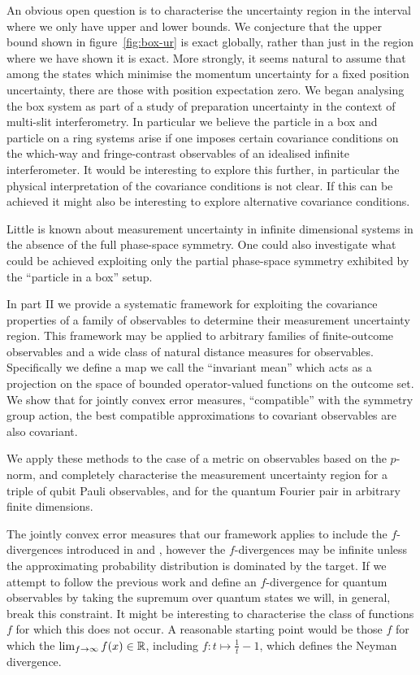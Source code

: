 An obvious open question is to characterise the uncertainty region in the interval where we only have upper and lower bounds. We conjecture that the upper bound shown in figure~\ref{fig:box-ur} is exact globally, rather than just in the region where we have shown it is exact. More strongly, it seems natural to assume that among the states which minimise the momentum uncertainty for a fixed position uncertainty, there are those with position expectation zero. We began analysing the box system as part of a study of preparation uncertainty in the context of multi-slit interferometry. In particular we believe the particle in a box and particle on a ring systems arise if one imposes certain covariance conditions on the which-way and fringe-contrast observables of an idealised infinite interferometer. It would be interesting to explore this further, in particular the physical interpretation of the covariance conditions is not clear. If this can be achieved it might also be interesting to explore alternative covariance conditions.

Little is known about measurement uncertainty in infinite dimensional systems in the absence of the full phase-space symmetry. One could also investigate what could be achieved exploiting only the partial phase-space symmetry exhibited by the ``particle in a box'' setup.


In part II we provide a systematic framework for exploiting the covariance properties of a family of observables to determine their measurement uncertainty region. This framework may be applied to arbitrary families of finite-outcome observables and a wide class of natural distance measures for observables. Specifically we define a map we call the ``invariant mean'' which acts as a projection on the space of bounded operator-valued functions on the outcome set. We show that for jointly convex error measures, ``compatible'' with the symmetry group action, the best compatible approximations to covariant observables are also covariant.

We apply these methods to the case of a metric on observables based on the $p$-norm, and completely characterise the measurement uncertainty region for a triple of qubit Pauli observables, and for the quantum Fourier pair in arbitrary finite dimensions. 

The jointly convex error measures that our framework applies to include the $f$-divergences introduced in \cite{10.2307/2984279} and \cite{der1964informationstheoretische}, however the $f$-divergences may be infinite unless the approximating probability distribution is dominated by the target. If we attempt to follow the previous work and define an $f$-divergence for quantum observables by taking the supremum over quantum states we will, in general, break this constraint. It might be interesting to characterise the class of functions $f$ for which this does not occur. A reasonable starting point would be those $f$ for which the $\lim_{f\to\infty}f(x) \in \mathbb{R}$, including $f:t\mapsto \frac{1}{t}-1$, which defines the Neyman divergence.

